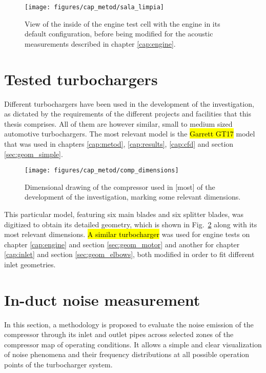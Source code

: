 \begin{figure}[b!]
\centering
\texttt{[image: figures/cap\_metod/sala\_limpia]}
\caption{View of the inside of the engine test cell with the engine in its default configuration, before being modified for the acoustic measurements described in chapter \ref{cap:engine}.}
\label{fig:engine_cell_clear}
\end{figure}

\section{Tested turbochargers}

Different turbochargers have been used in the development of the investigation, as dictated by the requirements of the different projects and facilities that this thesis comprises. All of them are however similar, small to medium sized automotive turbochargers. The most relevant model is the \hl{Garrett GT17} model that was used in chapters \ref{cap:metod}, \ref{cap:results}, \ref{cap:cfd} and section \ref{sec:geom_simple}. 

\begin{figure}[h!]
\centering
\texttt{[image: figures/cap\_metod/comp\_dimensions]}
\caption{Dimensional drawing of the compressor used in [most] of the development of the investigation, marking some relevant dimensions.}
\label{fig:comp_dimens}
\end{figure}

This particular model, featuring six main blades and six splitter blades, was digitized to obtain its detailed geometry, which is shown in Fig.~\ref{fig:comp_dimens} along with its most relevant dimensions. \hl{A similar turbocharger} was used for engine tests on chapter \ref{cap:engine} and section \ref{sec:geom_motor} and another for chapter \ref{cap:inlet} and section \ref{sec:geom_elbows}, both modified in order to fit different inlet geometries.

\section{In-duct noise measurement} %
\label{sec:method_induct}

In this section, a methodology is proposed to evaluate the noise emission of the compressor through its inlet and outlet pipes across selected zones of the compressor map of operating conditions. It allows a simple and clear visualization of noise phenomena and their frequency distributions at all possible operation points of the turbocharger system.

